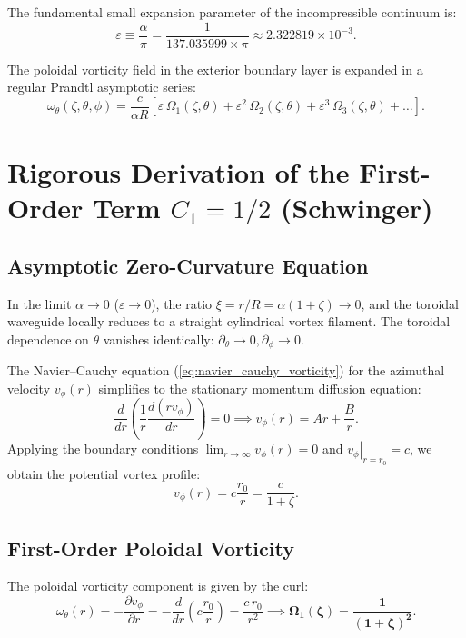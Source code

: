 \documentclass[12pt,a4paper]{article}
\begin{document}
	The fundamental small expansion parameter of the incompressible continuum is:
	\begin{equation}
		\varepsilon \equiv \frac{\alpha}{\pi} = \frac{1}{137.035999 \times \pi} \approx 2.322819 \times 10^{-3}.
	\end{equation}
	
	The poloidal vorticity field in the exterior boundary layer is expanded in a regular Prandtl asymptotic series:
	\begin{equation}
		\omega_\theta(\zeta, \theta, \phi) = \frac{c}{\alpha R} \left[ \varepsilon \, \Omega_1(\zeta, \theta) + \varepsilon^2 \, \Omega_2(\zeta, \theta) + \varepsilon^3 \, \Omega_3(\zeta, \theta) + \dots \right].
		\label{eq:prandtl_expansion}
	\end{equation}
	
	\section{Rigorous Derivation of the First-Order Term $C_1 = 1/2$ (Schwinger)}
	
	\subsection{Asymptotic Zero-Curvature Equation}
	In the limit $\alpha \to 0$ ($\varepsilon \to 0$), the ratio $\xi = r/R = \alpha(1+\zeta) \to 0$, and the toroidal waveguide locally reduces to a straight cylindrical vortex filament. The toroidal dependence on $\theta$ vanishes identically: $\partial_\theta \to 0, \partial_\phi \to 0$.
	
	The Navier--Cauchy equation (\ref{eq:navier_cauchy_vorticity}) for the azimuthal velocity $v_\phi(r)$ simplifies to the stationary momentum diffusion equation:
	\begin{equation}
		\frac{d}{dr}\left( \frac{1}{r} \frac{d(r v_\phi)}{dr} \right) = 0 \implies v_\phi(r) = A r + \frac{B}{r}.
	\end{equation}
	Applying the boundary conditions $\lim_{r \to \infty} v_\phi(r) = 0$ and $\left. v_\phi \right|_{r = r_0} = c$, we obtain the potential vortex profile:
	\begin{equation}
		v_\phi(r) = c \frac{r_0}{r} = \frac{c}{1 + \zeta}.
	\end{equation}
	
	\subsection{First-Order Poloidal Vorticity}
	The poloidal vorticity component is given by the curl:
	\begin{equation}
		\omega_\theta(r) = -\frac{\partial v_\phi}{\partial r} = -\frac{d}{dr}\left( c \frac{r_0}{r} \right) = \frac{c \, r_0}{r^2} \implies \mathbf{\Omega_1(\zeta) = \frac{1}{(1 + \zeta)^2}}.
	\end{equation}
	
\end{document}
